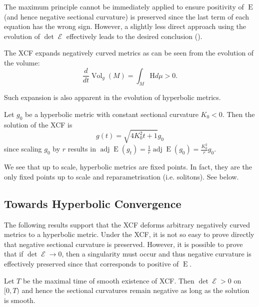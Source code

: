 \documentclass{cambridge7a}
\renewcommand{\~}{\tilde}
\renewcommand{\-}{\bar}
\newcommand{\8}{\infty}
\DeclareMathOperator{\Ein}{E}
\DeclareMathOperator{\opEin}{\mathcal{E}}
\DeclareMathOperator{\adj}{adj}
\begin{document}
The maximum principle cannot be immediately applied to ensure positivity of \(\Ein\) (and hence negative sectional curvature) is preserved since the last term of each equation has the wrong sign. However, a slightly less direct approach using the evolution of \(\det \opEin\) effectively leads to the desired conclusion ().

The XCF expands negatively curved metrics as can be seen from the evolution of the volume:
\begin{equation}
\label{eq:dtvol}
\frac{d}{dt} \operatorname{Vol}_g (M) = \int_M \mathrm{H}d\mu > 0.
\end{equation}

Such expansion is also apparent in the evolution of hyperbolic metrics.
\begin{example}
\label{eq:hyperbolic}

Let \(g_0\) be a hyperbolic metric with constant sectional curvature \(K_0 < 0\). Then the solution of the XCF is
\[
g(t) = \sqrt{4K_0^2 t + 1} g_0
\]
since scaling \(g_0\) by \(r\) results in \(\adj\Ein(g_t) = \frac{1}{r} \adj\Ein(g_0) = \frac{K_0^2}{r} g_0\).
\end{example}

We see that up to scale, hyperbolic metrics are fixed points. In fact, they are the only fixed points up to scale and reparametrisation (i.e. solitons). See  below.

\subsection{Towards Hyperbolic Convergence}
\label{subsec:xcf_hyperbolic_convergence}

The following results support  that the XCF deforms arbitrary negatively curved metrics to a hyperbolic metric. Under the XCF, it is not so easy to prove directly that negative sectional curvature is preserved. However, it is possible to prove that if \(\det \opEin \to 0\), then a singularity must occur and thus negative curvature is effectively preserved since that corresponds to positive of \(\Ein\).

\begin{prop}[{\cite[p. 8]{MR2055396}}]
\label{prop:negative_perserved}

Let $T$ be the maximal time of smooth existence of XCF. Then \(\det \opEin > 0\) on \([0, T)\) and hence the sectional curvatures remain negative as long as the solution is smooth.
\end{prop}
\end{document}
